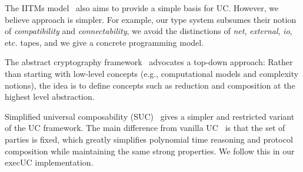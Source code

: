 The IITMs model~\cite{kusters2006simulation,camenischiuc} also aims to provide a
simple basis for UC.  However, we believe approach is simpler. For example, our type
system subsumes their notion of \emph{compatibility} and \emph{connectability},
we avoid the distinctions of \emph{net}, \emph{external}, \emph{io}, etc. tapes,
and we give a concrete programming model.

The abstract cryptography framework~\cite{maurer2011abstract} advocates a
top-down approach: Rather than starting with low-level concepts (e.g.,
computational models and complexity notions), the idea is to define concepts
such as reduction and composition at the highest level abstraction. \todo{}

Simplified universal composability (SUC)~\cite{canetti2015simpler} gives a
simpler and restricted variant of the UC framework. The main difference from
vanilla UC~\cite{canetti2001universally} is that the set of parties is fixed,
which greatly simplifies polynomial time reasoning and protocol composition
while maintaining the same strong properties.  We follow this in our
\textsf{execUC} implementation.

